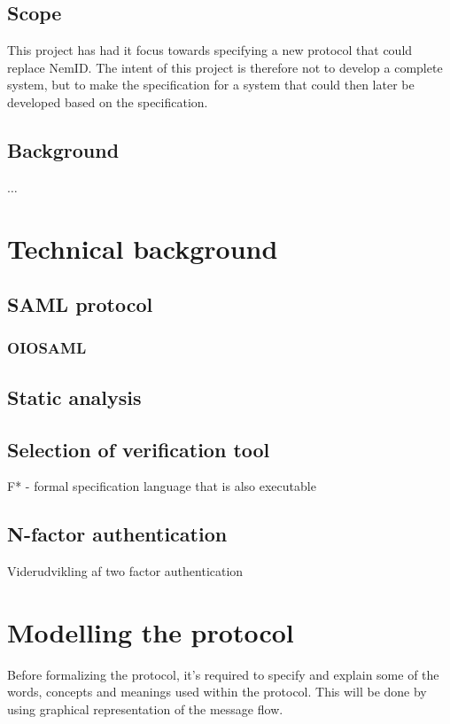 \documentclass[twosided]{report}
\begin{document}
\section{Scope}
This project has had it focus towards specifying a new protocol that could replace NemID. The intent of this project is therefore not to develop a complete system, but to make the specification for a system that could then later be developed based on the specification.

\section{Background}
$\ldots$
 
\chapter{Technical background}

\section{SAML protocol}

\subsection{OIOSAML}

\section{Static analysis}

\section{Selection of verification tool}
F* - formal specification language that is also executable

\section{N-factor authentication}
\label{sect:nfactauth}
Viderudvikling af two factor authentication


\chapter{Modelling the protocol}
Before formalizing the protocol, it's required to specify and explain some of the words, concepts and meanings used within the protocol. This will be done by using graphical representation of the message flow.
\end{document}
